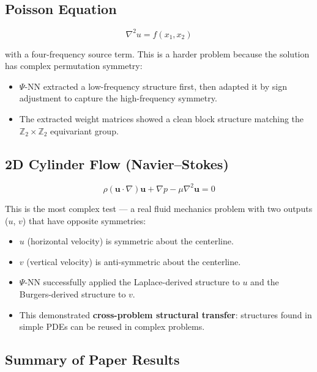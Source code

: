 \documentclass[11pt,a4paper]{article}
\begin{document}
\subsection{Poisson Equation}

$$\nabla^2 u = f(x_1, x_2)$$

with a four-frequency source term. This is a harder problem because the solution has complex permutation symmetry:

\begin{itemize}[nosep]
    \item $\Psi$-NN extracted a low-frequency structure first, then adapted it by sign adjustment to capture the high-frequency symmetry.
    \item The extracted weight matrices showed a clean block structure matching the $\mathbb{Z}_2 \times \mathbb{Z}_2$ equivariant group.
\end{itemize}

\subsection{2D Cylinder Flow (Navier--Stokes)}

$$\rho(\mathbf{u} \cdot \nabla)\mathbf{u} + \nabla p - \mu \nabla^2 \mathbf{u} = 0$$

This is the most complex test --- a real fluid mechanics problem with two outputs ($u$, $v$) that have opposite symmetries:

\begin{itemize}[nosep]
    \item $u$ (horizontal velocity) is symmetric about the centerline.
    \item $v$ (vertical velocity) is anti-symmetric about the centerline.
    \item $\Psi$-NN successfully applied the Laplace-derived structure to $u$ and the Burgers-derived structure to $v$.
    \item This demonstrated \textbf{cross-problem structural transfer}: structures found in simple PDEs can be reused in complex problems.
\end{itemize}

\subsection{Summary of Paper Results}
\end{document}

